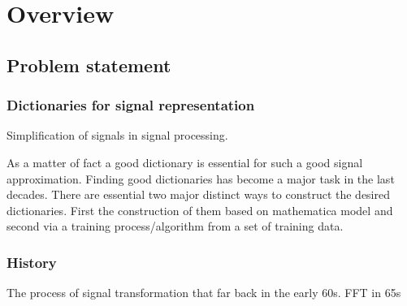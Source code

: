 \chapter{Overview}
\thispagestyle{empty}

\section{Problem statement}


\subsection{Dictionaries for signal representation}


Simplification of signals in signal processing.

As a matter of fact a good dictionary is essential for such a good signal approximation. \cite{} 
Finding good dictionaries has become a major task in the last decades.
There are essential two major distinct ways to construct the desired dictionaries. First the construction of them based on mathematica model and second
via a training process/algorithm from a set of training data.




\subsection{History}

The process of signal transformation that far back in the early 60s.\cite{sparse intro}
FFT in 65s

